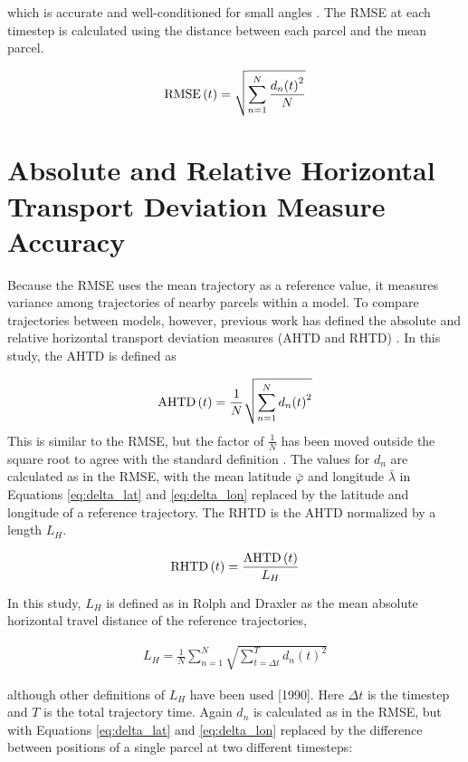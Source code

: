 which is accurate and well-conditioned for small angles \cite{sinnott_virtues_1984}. 
The RMSE at each timestep is calculated using the distance between each parcel and the mean parcel.

\begin{align}
    \operatorname{RMSE}{(t)} = \sqrt{ \sum_{n = 1}^{N} \frac{{d_n(t)}^2}{N} }
\end{align}

\section{Absolute and Relative Horizontal Transport Deviation Measure Accuracy}

Because the RMSE uses the mean trajectory as a reference value, it measures variance among trajectories of nearby parcels within a model.
To compare trajectories between models, however, previous work has defined the absolute and relative horizontal transport deviation measures (AHTD and RHTD) \cite{stohl_computation_1998}. 
In this study, the AHTD is defined as

\begin{align}
    \operatorname{AHTD}{(t)} = \frac{1}{N} \sqrt{ \sum_{n = 1}^{N} {d_n(t)}^2 }
\end{align}
This is similar to the RMSE, but the factor of $\frac{1}{N}$ has been moved outside the square root to agree with the standard definition \cite{kuo_accuracy_1985, rolph_sensitivity_1990}.
The values for $d_n$ are calculated as in the RMSE, with the mean latitude $\bar{\varphi}$ and longitude $\bar{\lambda}$ in Equations \ref{eq:delta_lat} and \ref{eq:delta_lon} replaced by the latitude and longitude of a reference trajectory.
The RHTD is the AHTD normalized by a length $L_H$.

\begin{align}
    \operatorname{RHTD}{(t)} = \frac{\operatorname{AHTD}{(t)}}{L_H}
\end{align}
 
In this study, $L_H$ is defined as in Rolph and Draxler as the mean absolute horizontal travel distance of the reference trajectories,

\begin{align}
    L_H = \frac{1}{N} \sum_{n = 1}^{N} \sqrt{ \sum_{t = \Delta t}^{T} {d_n(t)}^2}
\end{align}

although other definitions of $L_H$ have been used [1990].
Here $\Delta t$ is the timestep and $T$ is the total trajectory time.
Again $d_n$ is calculated as in the RMSE, but with Equations \ref{eq:delta_lat} and \ref{eq:delta_lon} replaced by the difference between positions of a single parcel at two different timesteps:

